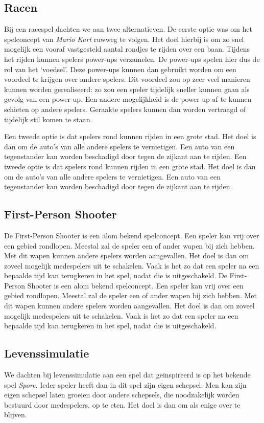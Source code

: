 \subsection{Racen}
Bij een racespel dachten we aan twee alternatieven. De eerste optie was om het spelconcept van \emph{Mario Kart} ruwweg te volgen. Het doel hierbij is om zo snel mogelijk een vooraf vastgesteld aantal rondjes te rijden over een baan. Tijdens het rijden kunnen spelers power-ups verzamelen. De power-ups spelen hier dus de rol van het `voedsel'. Deze power-ups kunnen dan gebruikt worden om een voordeel te krijgen over andere spelers. Dit voordeel zou op zeer veel manieren kunnen worden gerealiseerd: zo zou een speler tijdelijk sneller kunnen gaan als gevolg van een power-up. Een andere mogelijkheid is de power-up af te kunnen schieten op andere spelers. Geraakte spelers kunnen dan worden vertraagd of tijdelijk stil komen te staan.

Een tweede optie is dat spelers rond kunnen rijden in een grote stad. Het doel is dan om de auto's van alle andere spelers te vernietigen. Een auto van een tegenstander kan worden beschadigd door tegen de zijkant aan te rijden. 
Een tweede optie is dat spelers rond kunnen rijden in een grote stad. Het doel is dan om de auto's van alle andere spelers te vernietigen. Een auto van een tegenstander kan worden beschadigd door tegen de zijkant aan te rijden.

\subsection{First-Person Shooter}
De First-Person Shooter is een alom bekend spelconcept. Een speler kan vrij over een gebied rondlopen. Meestal zal de speler een of ander wapen bij zich hebben. Met dit wapen kunnen andere spelers worden aangevallen. Het doel is dan om zoveel mogelijk medespelers uit te schakelen. Vaak is het zo dat een speler na een bepaalde tijd kan terugkeren in het spel, nadat die is uitgeschakeld. 
De First-Person Shooter is een alom bekend spelconcept. Een speler kan vrij over een gebied rondlopen. Meestal zal de speler een of ander wapen bij zich hebben. Met dit wapen kunnen andere spelers worden aangevallen. Het doel is dan om zoveel mogelijk medespelers uit te schakelen. Vaak is het zo dat een speler na een bepaalde tijd kan terugkeren in het spel, nadat die is uitgeschakeld.

\subsection{Levenssimulatie}
We dachten bij levenssimulatie aan een spel dat ge\"inspireerd is op het bekende spel \emph{Spore}. Ieder speler heeft dan in dit spel zijn eigen schepsel. Men kan zijn eigen schepsel laten groeien door andere schepsels, die noodzakelijk worden bestuurd door medespelers, op te eten. Het doel is dan om als enige over te blijven.

